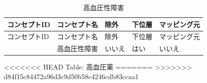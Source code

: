 \documentclass[
  11pt]{book}
\theoremstyle{definition}
\theoremstyle{definition}
\theoremstyle{definition}
\theoremstyle{definition}
\theoremstyle{remark}
\begin{document}
\begin{longtable}[]{@{}lllll@{}}
\caption{\label{tab:hypertensionAceMono} 高血圧性障害}\tabularnewline
\toprule\noalign{}
コンセプトID & コンセプト名 & 除外 & 下位層 & マッピング元 \\
\midrule\noalign{}
\endfirsthead
\toprule\noalign{}
コンセプトID & コンセプト名 & 除外 & 下位層 & マッピング元 \\
\midrule\noalign{}
\endhead
\bottomrule\noalign{}
\endlastfoot
316866 & 高血圧性障害 & いいえ & はい & いいえ \\
\end{longtable}

\textless\textless\textless\textless\textless\textless\textless{} HEAD
Table: \label{tab:htnDrugsAceMono} 高血圧薬
=======
\textgreater\textgreater\textgreater\textgreater\textgreater\textgreater\textgreater{} d84f15c84472a96d3c9d50b58c4246cdb83ccaa1
\end{document}
